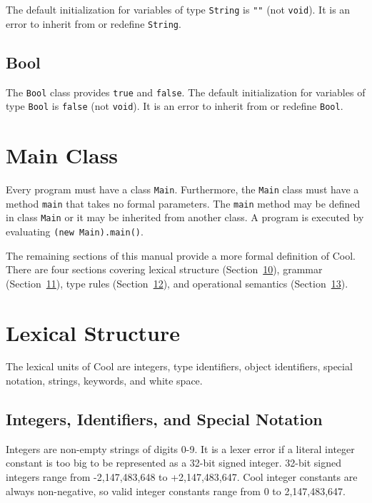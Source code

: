 \documentclass[]{article}
\begin{document}
The default initialization for variables of type \texttt{String} is
\texttt{""} (not \texttt{void}). It is an error to inherit from or
redefine \texttt{String}.

\subsection{Bool}

The \texttt{Bool} class provides \texttt{true} and \texttt{false}. The
default initialization for variables of type \texttt{Bool} is
\texttt{false} (not \texttt{void}). It is an error to inherit from or
redefine \texttt{Bool}.


\section{Main Class}

Every program must have a class \texttt{Main}. Furthermore, the
\texttt{Main} class must have a method \texttt{main} that takes no
formal parameters. The \texttt{main} method may be defined in class
\texttt{Main} or it may be inherited from another class. A program is
executed by evaluating \texttt{(new Main).main()}.

The remaining sections of this manual provide a more formal definition
of Cool. There are four sections covering lexical structure
(Section~\href{node33.html\#lex-struct}{10}), grammar
(Section~\href{node39.html\#sec-gram}{11}), type rules
(Section~\href{node41.html\#sec-typrules}{12}), and operational
semantics (Section~\href{node44.html\#sec-opsem}{13}).

\section{Lexical Structure}

The lexical units of Cool are integers, type identifiers, object
identifiers, special notation, strings, keywords, and white space.

\subsection{Integers, Identifiers, and Special Notation}

Integers are non-empty strings of digits 0-9. It is a lexer error if a
literal integer constant is too big to be represented as a 32-bit signed
integer. 32-bit signed integers range from -2,147,483,648 to
+2,147,483,647. Cool integer constants are always non-negative, so valid
integer constants range from 0 to 2,147,483,647.
\end{document}
